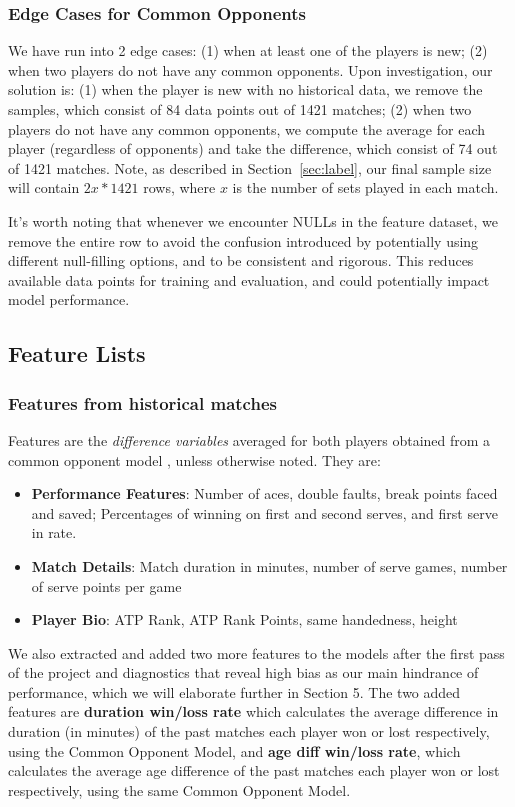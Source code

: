 \documentclass[paper=a4, fontsize=10pt]{scrartcl} %
\numberwithin{equation}{section} %
\numberwithin{figure}{section} %
\numberwithin{table}{section} %
\begin{document}
\subsubsection{Edge Cases for Common Opponents}
We have run into 2 edge cases: (1) when at least one of the players is new; (2) when two players do not have any common opponents. Upon investigation, our solution is: (1) when the player is new with no historical data, we remove the samples, which consist of 84 data points out of 1421 matches; (2) when two players do not have any common opponents, we compute the average for each player (regardless of opponents) and take the difference, which consist of 74 out of 1421 matches. Note, as described in Section~\ref{sec:label}, our final sample size will contain $2x * 1421$ rows, where $x$ is the number of sets played in each match.

It's worth noting that whenever we encounter NULLs in the feature dataset, we remove the entire row to avoid the confusion introduced by potentially using different null-filling options, and to be consistent and rigorous. This reduces available data points for training and evaluation, and could potentially impact model performance. 
\subsection{Feature Lists}
\label{sec:feat}
\subsubsection{Features from historical matches}
Features are the \textit{difference variables} averaged for both players obtained from a common opponent model \cite{KNOTTENBELT20123820}, unless otherwise noted. They are:
\begin{itemize}
\item \textbf{Performance Features}: Number of aces, double faults, break points faced and saved; Percentages of winning on first and second serves, and first serve in rate.
\item \textbf{Match Details}: Match duration in minutes, number of serve games, number of serve points per game
\item \textbf{Player Bio}: ATP Rank, ATP Rank Points, same handedness, height
\end{itemize}
We also extracted and added two more features to the models after the first pass of the project and diagnostics that reveal high bias as our main hindrance of performance, which we will elaborate further in Section 5. The two added features are \textbf{duration win/loss rate} which calculates the average difference in duration (in minutes) of the past matches each player won or lost respectively, using the Common Opponent Model, and \textbf{age diff win/loss rate}, which calculates the average age difference of the past matches each player won or lost respectively, using the same Common Opponent Model.
\end{document}
